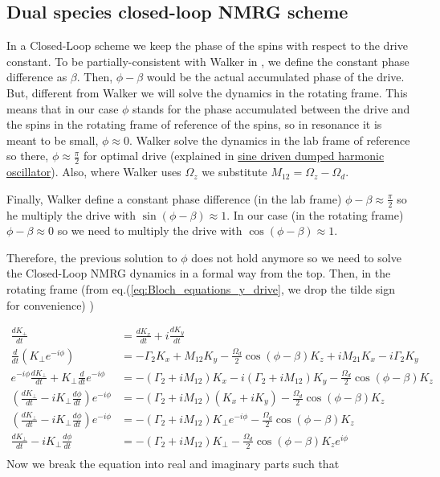 \documentclass{article}
\begin{document}
\subsection{Dual species closed-loop NMRG scheme}
{\color{green}
In a Closed-Loop scheme we keep the phase of the spins with respect to the drive constant. To be partially-consistent with Walker in \cite{walker2016spin}, we define the constant phase difference as $\beta$. Then, $\phi-\beta$ would be the actual accumulated phase of the drive. But, different from Walker we will solve the dynamics in the rotating frame. This means that in our case $\phi$ stands for the phase accumulated between the drive and the spins in the rotating frame of reference of the spins, so in resonance it is meant to be small, $\phi\approx 0$. Walker solve the dynamics in the lab frame of reference so there, $\phi\approx \frac{\pi}{2}$ for optimal drive (explained in \href{https://en.wikipedia.org/wiki/Harmonic_oscillator#Sinusoidal_driving_force}{sine driven dumped harmonic oscillator}). Also, where Walker uses $\Omega_z$ we substitute $M_{12}=\Omega_z-\Omega_d$. 

Finally, Walker define a constant phase difference (in the lab frame) $\phi-\beta\approx \frac{\pi}{2}$ so he multiply the drive with $\sin{\left(\phi-\beta\right)}\approx 1$. In our case (in the rotating frame) $\phi-\beta\approx 0$ so we need to multiply the drive with $\cos{\left(\phi-\beta\right)}\approx 1$.

Therefore, the previous solution to $\phi$ does not hold anymore so we need to solve the Closed-Loop NMRG dynamics in a formal way from the top. Then, in the rotating frame (from eq.(\ref{eq:Bloch_equations_y_drive}, we drop the tilde sign for convenience) )}

\begin{align}
    \frac{d K_{+}}{dt} &= \frac{d K_{x}}{dt} + i\frac{d K_{y}}{dt}\\
    \frac{d }{dt}\left( K_{\perp}e^{-i\phi}\right) &= -\Gamma_2 K_x + M_{12} K_y - \frac{\Omega_d}{2} \cos{\left(\phi-\beta\right)}K_z + iM_{21}K_x - i\Gamma_2 K_y\\
    e^{-i\phi}\frac{d K_{\perp}}{dt} + K_{\perp}\frac{d }{dt}e^{-i\phi} &= -\left(\Gamma_2 + iM_{12}\right)K_x -i\left(\Gamma_2 + iM_{12}\right)K_y - \frac{\Omega_d}{2} \cos{\left(\phi-\beta\right)}K_z \\
    \left(\frac{d K_{\perp}}{dt} -i K_{\perp}\frac{d \phi}{dt}\right)e^{-i\phi} &= -\left(\Gamma_2 + iM_{12}\right)\left(K_x +iK_y\right) - \frac{\Omega_d}{2}\cos{\left(\phi-\beta\right)} K_z \\
    \left(\frac{d K_{\perp}}{dt} -i K_{\perp}\frac{d \phi}{dt}\right)e^{-i\phi} &= -\left(\Gamma_2 + iM_{12}\right)K_{\perp}e^{-i\phi} - \frac{\Omega_d}{2} \cos{\left(\phi-\beta\right)}K_z \\
    \frac{d K_{\perp}}{dt} -i K_{\perp}\frac{d \phi}{dt} &= -\left(\Gamma_2 + iM_{12}\right)K_{\perp} - \frac{\Omega_d}{2}\cos{\left(\phi-\beta\right)} K_z e^{i\phi} \\
\end{align}
Now we break the equation into real and imaginary parts such that
\end{document}

